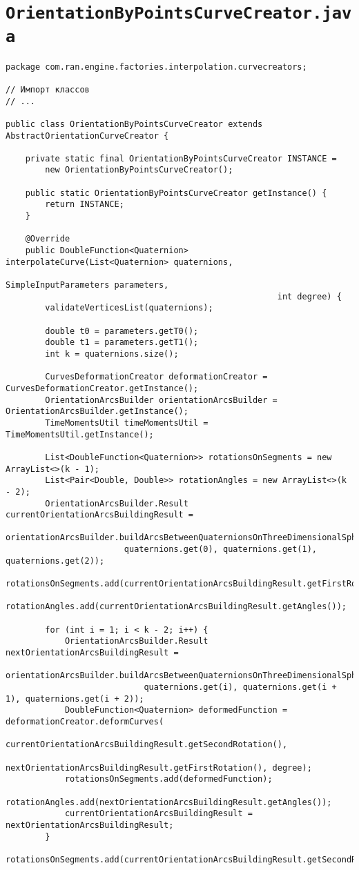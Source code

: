 \section*{\texttt{OrientationByPointsCurveCreator.java}}
\begin{verbatim}
package com.ran.engine.factories.interpolation.curvecreators;

// Импорт классов
// ...

public class OrientationByPointsCurveCreator extends AbstractOrientationCurveCreator {

    private static final OrientationByPointsCurveCreator INSTANCE =
        new OrientationByPointsCurveCreator();

    public static OrientationByPointsCurveCreator getInstance() {
        return INSTANCE;
    }

    @Override
    public DoubleFunction<Quaternion> interpolateCurve(List<Quaternion> quaternions,
                                                       SimpleInputParameters parameters,
                                                       int degree) {
        validateVerticesList(quaternions);

        double t0 = parameters.getT0();
        double t1 = parameters.getT1();
        int k = quaternions.size();

        CurvesDeformationCreator deformationCreator = CurvesDeformationCreator.getInstance();
        OrientationArcsBuilder orientationArcsBuilder = OrientationArcsBuilder.getInstance();
        TimeMomentsUtil timeMomentsUtil = TimeMomentsUtil.getInstance();

        List<DoubleFunction<Quaternion>> rotationsOnSegments = new ArrayList<>(k - 1);
        List<Pair<Double, Double>> rotationAngles = new ArrayList<>(k - 2);
        OrientationArcsBuilder.Result currentOrientationArcsBuildingResult =
                orientationArcsBuilder.buildArcsBetweenQuaternionsOnThreeDimensionalSphere(
                        quaternions.get(0), quaternions.get(1), quaternions.get(2));
        rotationsOnSegments.add(currentOrientationArcsBuildingResult.getFirstRotation());
        rotationAngles.add(currentOrientationArcsBuildingResult.getAngles());

        for (int i = 1; i < k - 2; i++) {
            OrientationArcsBuilder.Result nextOrientationArcsBuildingResult =
                    orientationArcsBuilder.buildArcsBetweenQuaternionsOnThreeDimensionalSphere(
                            quaternions.get(i), quaternions.get(i + 1), quaternions.get(i + 2));
            DoubleFunction<Quaternion> deformedFunction = deformationCreator.deformCurves(
                    currentOrientationArcsBuildingResult.getSecondRotation(),
                    nextOrientationArcsBuildingResult.getFirstRotation(), degree);
            rotationsOnSegments.add(deformedFunction);
            rotationAngles.add(nextOrientationArcsBuildingResult.getAngles());
            currentOrientationArcsBuildingResult = nextOrientationArcsBuildingResult;
        }
        rotationsOnSegments.add(currentOrientationArcsBuildingResult.getSecondRotation());


\end{verbatim}
